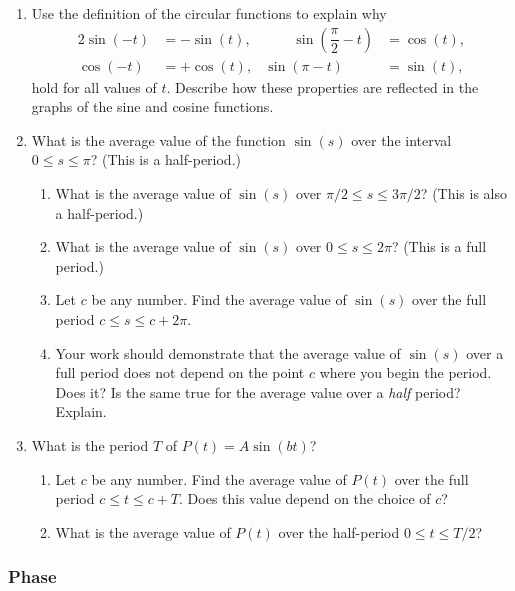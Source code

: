 \begin{enumerate}
\begin{enumerate}
\end{enumerate}
\item Use the definition of the circular functions to explain why
\begin{alignat*}{2}
\sin(-t) &= -\sin(t), & \qquad  
	\sin\!\left(\dfrac{\pi}{2} - t\right) &= \cos(t), \\
\cos(-t) &= +\cos(t), & \sin(\pi - t) &= \sin(t),
\end{alignat*}
hold for all values of $t$.  Describe how these properties are
reflected in the graphs of the sine and cosine functions.


\item What is the average value of the function $\sin(s)$ over the
interval $0 \leq s \leq \pi$?  (This is a half-period.)


  \begin{enumerate}
  \item What is the average value of $\sin(s)$ over $\pi/2 \leq s \leq
3\pi/2$?  (This is also a half-period.)


  \item What is the average value of $\sin(s)$ over $0 \leq s \leq 2\pi$?
(This is a full period.)


  \item Let $c$ be any number.  Find the average value of $\sin(s)$ over
the full period $c \leq s \leq c + 2\pi$.

  \item Your work should demonstrate that the average value of $\sin(s)$
over a full period does not depend on the point $c$ where you begin
the period.  Does it?  Is the same true for the average value over a
{\em half\/} period?  Explain.


\end{enumerate}
\item What is the period $T$ of $P(t) = A\sin(bt)$?

  \begin{enumerate}
  \item Let $c$ be any number.  Find the average value of $P(t)$ over the
full period $c \leq t \leq c + T$.  Does this value depend on the
choice of $c$?

  \item What is the average value of $P(t)$ over the half-period $0 \leq
t \leq T/2$?


\end{enumerate}
\end{enumerate}
\subsubsection{Phase}
\label{subsubsec:phase}

